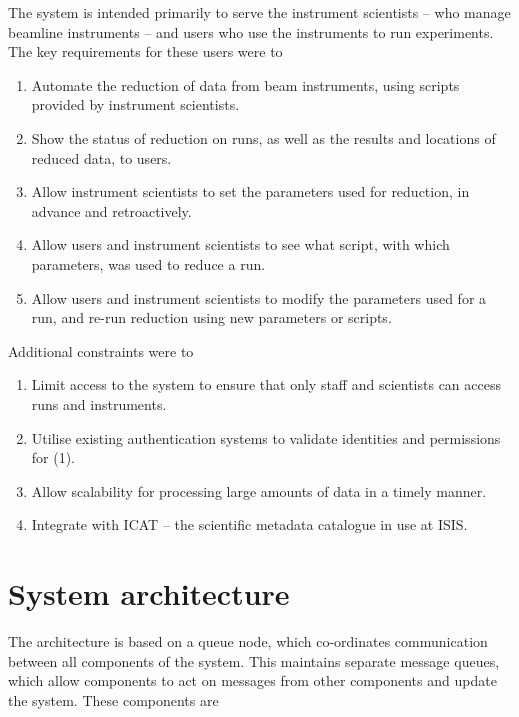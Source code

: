 \documentclass[twocolumn]{article}
\providecommand{\tightlist}{%
  \setlength{\itemsep}{0pt}\setlength{\parskip}{0pt}}
\begin{document}
The system is intended primarily to serve the instrument scientists --
who manage beamline instruments -- and users who use the instruments to
run experiments. The key requirements for these users were to

\begin{enumerate}
\def\labelenumi{\arabic{enumi}.}
\tightlist
\item
  Automate the reduction of data from beam instruments, using scripts
  provided by instrument scientists.
\item
  Show the status of reduction on runs, as well as the results and
  locations of reduced data, to users.
\item
  Allow instrument scientists to set the parameters used for reduction,
  in advance and retroactively.
\item
  Allow users and instrument scientists to see what script, with which
  parameters, was used to reduce a run.
\item
  Allow users and instrument scientists to modify the parameters used
  for a run, and re-run reduction using new parameters or scripts.
\end{enumerate}

Additional constraints were to

\begin{enumerate}
\def\labelenumi{\arabic{enumi}.}
\tightlist
\item
  Limit access to the system to ensure that only staff and scientists
  can access runs and instruments.
\item
  Utilise existing authentication systems to validate identities and
  permissions for (1).
\item
  Allow scalability for processing large amounts of data in a timely
  manner.
\item
  Integrate with ICAT -- the scientific metadata catalogue in use at
  ISIS.
\end{enumerate}

\section{System architecture}\label{system-architecture}

The architecture is based on a queue node, which co-ordinates
communication between all components of the system. This maintains
separate message queues, which allow components to act on messages from
other components and update the system. These components are
\end{document}
